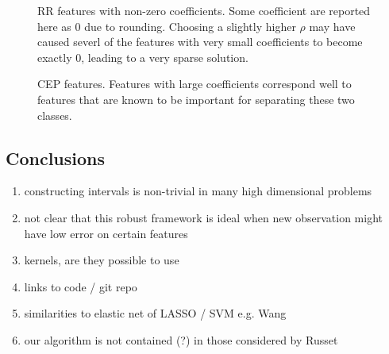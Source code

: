 \documentclass[10pt]{article}
\theoremstyle{definition}
\begin{document}
\begin{figure}

\caption{RR features with non-zero coefficients. Some coefficient are reported here as 0 due to rounding. Choosing a slightly higher $\rho$ may have caused severl of the features with very small coefficients to become exactly 0, leading to a very sparse solution.\label{fig:RRfeatures}}
\end{figure}

\begin{figure}

\caption{CEP features. Features with large coefficients correspond well to features that are known to be important for separating these two classes.\label{fig:CEPfeatures}}
\end{figure}





\subsection{Conclusions}
\begin{enumerate}
\item constructing intervals is non-trivial in many high dimensional problems
\item not clear that this robust framework is ideal when new observation might have low error on certain features
\item kernels, are they possible to use
\item links to code / git repo
\item similarities to elastic net of LASSO / SVM e.g. Wang \cite{wang2007hybrid}
\item our algorithm is not contained (?) in those considered by Russet \cite{rosset2007piecewise}
\end{enumerate}
\end{document}
